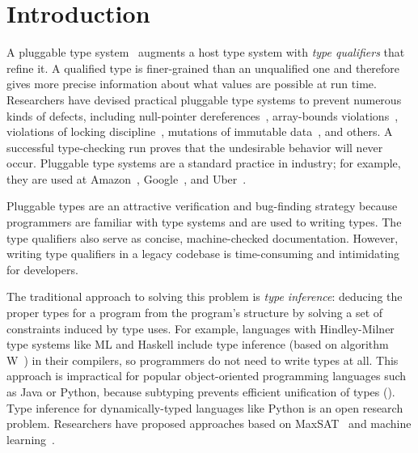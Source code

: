 \section{Introduction}
\label{sec:intro}



A pluggable type system~\cite{FosterFFA99} augments a host type system
with \emph{type qualifiers} that refine it.  A qualified type is
finer-grained than an unqualified one and therefore gives more precise
information about what values are possible at run time.
Researchers have devised practical pluggable type systems
to prevent numerous kinds of defects, including null-pointer
dereferences~\cite{BanerjeeCS2019,PapiACPE2008,DietlDEMS2011},
array-bounds violations~\cite{KelloggDME2018},
violations of locking discipline~\cite{ErnstLMST2016},
mutations of immutable data~\cite{DietlDEMS2011,PapiACPE2008,coblenz2017glacier},
and others.
A successful type-checking run proves that the undesirable behavior will
never occur.
Pluggable type systems are a standard practice in industry; for example,
they are used at Amazon~\cite{KelloggSTE2020,KelloggRSSE2020},
Google~\cite{SadowskiAEMCJ2018}, and Uber~\cite{BanerjeeCS2019}.

Pluggable types are an attractive verification and bug-finding strategy
because programmers
are familiar with type systems and are used to writing types.
The type qualifiers also serve as concise, machine-checked documentation.
However, writing type qualifiers in a legacy codebase
is time-consuming and intimidating for developers.

The traditional approach to solving this problem
is \emph{type inference}:
deducing the proper types for a program from the program's structure
by solving a set of constraints induced by type uses.
%
For example, languages with Hindley-Milner type systems like ML and Haskell
include type inference (based on algorithm W~\cite{DamasM1982})
in their compilers, so programmers do not need to write types at all.
%
This approach is impractical for popular object-oriented programming
languages such as Java or Python, because subtyping prevents efficient
unification of types ().
%
Type inference for dynamically-typed languages like Python is an open
research problem. Researchers have proposed approaches based
on MaxSAT~\cite{hassan2018maxsmt} and machine learning~\cite{xu2016python,peng2022static}.

